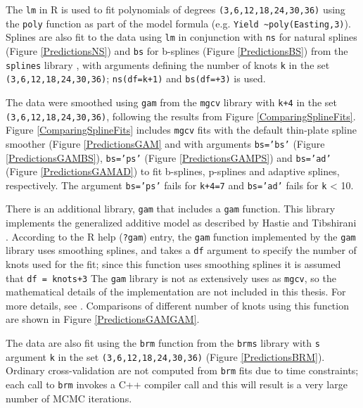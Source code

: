 \documentclass[phdcss]{SDSUThesis}
\begin{document}
The \texttt{lm} in R is used to fit polynomials of degrees \texttt{(3,6,12,18,24,30,36)} using the \texttt{poly} function as part of the model formula (e.g. \texttt{Yield \textasciitilde poly(Easting,3)}). Splines are also fit to the data using \texttt{lm} in conjunction with \texttt{ns} for natural splines (Figure \ref{PredictionsNS}) and \texttt{bs} for b-splines (Figure \ref{PredictionsBS}) from the \texttt{splines} library \cite{perperoglou-2019, rcore}, with arguments defining the number of knots \texttt{k} in the set \texttt{(3,6,12,18,24,30,36)}; \texttt{ns(df=k+1)} and \texttt{bs(df=+3)} is used. 

The data were smoothed using \texttt{gam} from the \texttt{mgcv} library \cite{wood-2017} with \texttt{k+4} in the set \texttt{(3,6,12,18,24,30,36)}, following the results from Figure \ref{ComparingSplineFits}. Figure \ref{ComparingSplineFits} includes \texttt{mgcv} fits with the default thin-plate spline smoother (Figure \ref{PredictionsGAM} and with arguments \texttt{bs='bs'} (Figure \ref{PredictionsGAMBS}), \texttt{bs='ps'} (Figure \ref{PredictionsGAMPS}) and \texttt{bs='ad'} (Figure \ref{PredictionsGAMAD}) to fit b-splines, p-splines and adaptive splines, respectively. The argument \texttt{bs='ps'} fails for \texttt{k+4=7} and \texttt{bs='ad'} fails for \texttt{k} < 10. 

There is an additional library, \texttt{gam} that includes a \texttt{gam} function. This library implements the generalized additive model as described by Hastie and Tibshirani \cite{hastie-1996}. According to the R help (\texttt{?gam}) entry, the \texttt{gam} function implemented by the \texttt{gam} library uses smoothing splines, and takes a \texttt{df} argument to specify the number of knots used for the fit; since this function uses smoothing splines it is assumed that \texttt{df = knots+3} The \texttt{gam} library is not as extensively uses as \texttt{mgcv}, so the mathematical details of the implementation are not included in this thesis. For more details, see \cite{hastie-1992}. Comparisons of different number of knots using this function are shown in Figure \ref{PredictionsGAMGAM}.

The data are also fit using the \texttt{brm} function from the \texttt{brms} \cite{burkner_2017} library with \texttt{s} argument \texttt{k} in the set \texttt{(3,6,12,18,24,30,36)} (Figure \ref{PredictionsBRM}). Ordinary cross-validation are not computed from \texttt{brm} fits due to time constraints; each call to \texttt{brm} invokes a C++ compiler call and this will result is a very large number of  MCMC iterations. 
\end{document}
